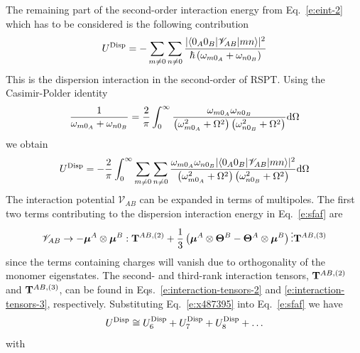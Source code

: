 \documentclass[a4paper,titlepage,twoside,fleqn,12pt]{book}
\newcommand{\BM}[1]{\bm{#1}}
\begin{document}
\begin{refsection}
The remaining part of the second\hyp{}order interaction
energy from Eq.~\eqref{e:eint-2} which has to be considered
is the following contribution
%
\begin{equation} \label{e:eint-2-disp}
U^{\rm Disp} = - \sum_{m\ne 0} \sum_{n\ne 0} \frac{
\lvert \langle 0_A0_B \lvert \mathscr{V}_{AB} \rvert mn \rangle \rvert^2
}{\hbar \left( \omega_{m0_A} + \omega_{n0_B}\right)}
\end{equation}
%
This is the dispersion interaction in the second\hyp{}order of RSPT.
Using the Casimir\hyp{}Polder identity
%
\begin{equation} \label{e:Casimir-Polder}
\frac{1}{\omega_{m0_A}+\omega_{n0_B}} =\frac{2}{\pi} \int_0^{\infty} 
\frac{\omega_{m0_A}\omega_{n0_B}}
{\left(\omega_{m0_A}^2+\Omega^2\right)\left(\omega_{n0_B}^2+\Omega^2\right)} {\rm d}\Omega
\end{equation}
%
we obtain
%
\begin{equation} \label{e:sfaf}
U^{\rm Disp} =-\frac{2}{\pi}\int_0^{\infty} \sum_{m\ne 0} \sum_{n\ne 0}
\frac{\omega_{m0_A}\omega_{n0_B}
\lvert \langle 0_A0_B \lvert \mathscr{V}_{AB} \rvert mn \rangle \rvert^2
}
{\left(\omega_{m0_A}^2+\Omega^2\right)\left(\omega_{n0_B}^2+\Omega^2\right)} {\rm d}\Omega
\end{equation}
%
The interaction potential $\mathscr{V}_{AB}$ can be expanded in terms of multipoles. 
The first two terms contributing to the dispersion interaction energy 
in Eq.~\eqref{e:sfaf} are\citep{Smith.Ruedenberg.Gordon.Slipchenko.JCP.2012}
%
\begin{equation} \label{e:x487395}
\mathscr{V}_{AB} \rightarrow
- {\BM \mu}^A \otimes {\BM \mu}^B : {\bf T}^{AB,(2)} + \frac{1}{3} 
\left( 
 {\BM \mu}^A \otimes {\BM \Theta}^B - {\BM \Theta}^A \otimes {\BM \mu}^B
\right) \vdots {\bf T}^{AB,(3)}
\end{equation}
%
since the terms containing charges will vanish due to orthogonality 
of the monomer eigenstates. The second- and third\hyp{}rank interaction tensors,
${\bf T}^{AB,(2)}$ and ${\bf T}^{AB,(3)}$, 
can be found in Eqs.~\eqref{e:interaction-tensors-2} 
and \eqref{e:interaction-tensors-3}, respectively.
Substituting Eq.~\eqref{e:x487395} into Eq.~\eqref{e:sfaf} we have
%
\begin{equation}
 U^{\rm Disp} \cong  U^{\rm Disp}_6 + U^{\rm Disp}_7 + U^{\rm Disp}_8 + \ldots
\end{equation}
%
with
%
\begin{subequations} \label{e:udisp-6-7-8}
 \begin{align}

\end{align}
\end{subequations}
\end{refsection}
\end{document}
